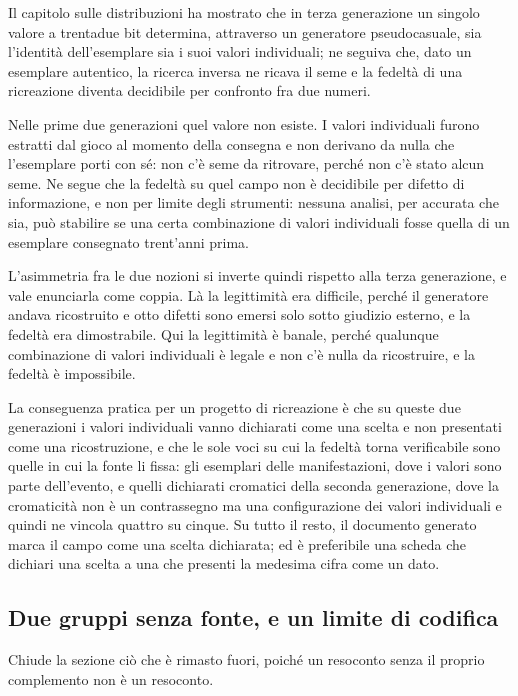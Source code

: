 Il capitolo sulle distribuzioni ha mostrato che in terza generazione un singolo valore a trentadue bit determina, attraverso un generatore pseudocasuale, sia l'identità dell'esemplare sia i suoi valori individuali; ne seguiva che, dato un esemplare autentico, la ricerca inversa ne ricava il seme e la fedeltà di una ricreazione diventa decidibile per confronto fra due numeri.

Nelle prime due generazioni quel valore non esiste. I valori individuali furono estratti dal gioco al momento della consegna e non derivano da nulla che l'esemplare porti con sé: non c'è seme da ritrovare, perché non c'è stato alcun seme. Ne segue che la fedeltà su quel campo non è decidibile per difetto di informazione, e non per limite degli strumenti: nessuna analisi, per accurata che sia, può stabilire se una certa combinazione di valori individuali fosse quella di un esemplare consegnato trent'anni prima.

L'asimmetria fra le due nozioni si inverte quindi rispetto alla terza generazione, e vale enunciarla come coppia. Là la legittimità era difficile, perché il generatore andava ricostruito e otto difetti sono emersi solo sotto giudizio esterno, e la fedeltà era dimostrabile. Qui la legittimità è banale, perché qualunque combinazione di valori individuali è legale e non c'è nulla da ricostruire, e la fedeltà è impossibile.

La conseguenza pratica per un progetto di ricreazione è che su queste due generazioni i valori individuali vanno dichiarati come una scelta e non presentati come una ricostruzione, e che le sole voci su cui la fedeltà torna verificabile sono quelle in cui la fonte li fissa: gli esemplari delle manifestazioni, dove i valori sono parte dell'evento, e quelli dichiarati cromatici della seconda generazione, dove la cromaticità non è un contrassegno ma una configurazione dei valori individuali e quindi ne vincola quattro su cinque. Su tutto il resto, il documento generato marca il campo come una scelta dichiarata; ed è preferibile una scheda che dichiari una scelta a una che presenti la medesima cifra come un dato.

\subsection*{Due gruppi senza fonte, e un limite di codifica}

Chiude la sezione ciò che è rimasto fuori, poiché un resoconto senza il proprio complemento non è un resoconto.

